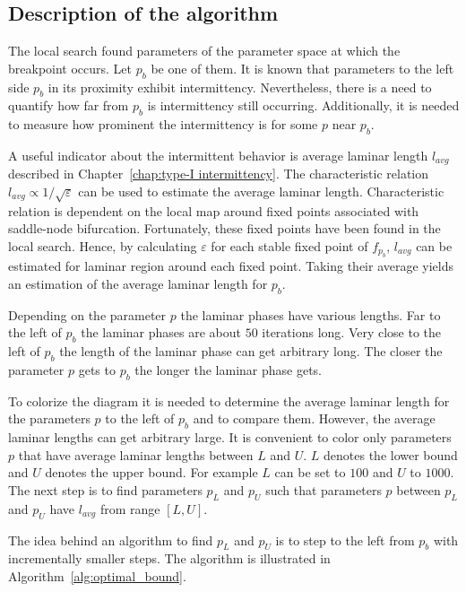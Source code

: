 \subsection{Description of the algorithm}
The local search found parameters of the parameter space at which the breakpoint occurs.
Let $p_b$ be one of them.
It is known that parameters to the left side $p_b$ in its proximity exhibit intermittency.
Nevertheless, there is a need to quantify how far from $p_b$ is intermittency still occurring.
Additionally, it is needed to measure how prominent the intermittency is for some $p$ near $p_b$.
\par
A useful indicator about the intermittent behavior is average laminar length $l_{avg}$ described in Chapter~\ref{chap:type-I intermittency}.
The characteristic relation $l_{avg} \varpropto 1 / \sqrt{\varepsilon}$ can be used to estimate the average laminar length.
Characteristic relation is dependent on the local map around fixed points associated with saddle-node bifurcation.
Fortunately, these fixed points have been found in the local search.
Hence, by calculating $\varepsilon$ for each stable fixed point of $f_{p_b}$, $l_{avg}$ can be estimated for laminar region around each fixed point.
Taking their average yields an estimation of the average laminar length for $p_b$.
\par
Depending on the parameter $p$ the laminar phases have various lengths.
Far to the left of $p_b$ the laminar phases are about $50$ iterations long.
Very close to the left of $p_b$ the length of the laminar phase can get arbitrary long.
The closer the parameter $p$ gets to $p_b$ the longer the laminar phase gets.
\par
To colorize the diagram it is needed to determine the average laminar length for the parameters $p$ to the left of $p_b$ and to compare them.
However, the average laminar lengths can get arbitrary large.
It is convenient to color only parameters $p$ that have average laminar lengths between $L$ and $U$. 
$L$ denotes the lower bound and $U$ denotes the upper bound.
For example $L$ can be set to $100$ and $U$ to $1000$.
The next step is to find parameters $p_L$ and $p_U$ such that parameters $p$ between $p_L$ and $p_U$ have $l_{avg}$ from range $[ L, U ]$.
\par
The idea behind an algorithm to find $p_L$ and $p_U$ is to step to the left from $p_b$ with incrementally smaller steps.
The algorithm is illustrated in Algorithm~\ref{alg:optimal_bound}.

